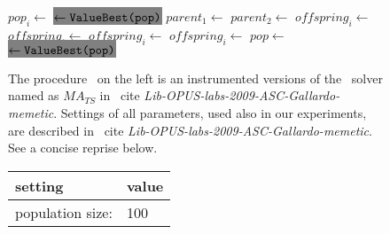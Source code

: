 
\begin{figure*}[t!]
\vspace*{-1ex}
\begin{minipage}[t]{0.49\linewidth}
\centering
\begin{algorithmic}[1]
 \label{alg_lssMAts_For1}
    \STATE $pop_i\gets$ 
    \STATE {}
\ENDFOR \label{alg_lssMAts_For2}
\STATE \colorbox{Gray}{ $\gets \texttt{{ValueBest}(pop)}$}
         \label{alg_lssMAts_Rec1}
            \STATE $parent_1 \gets $
            \STATE $parent_2 \gets $
            \STATE $\mathit{offspring_i}\gets$
        \ELSE
            \STATE $\mathit{offspring}_i \gets $
        \ENDIF \label{alg_lssMAts_Rec2}
         \label{alg_lssMAts_Mut1}
            \STATE $\mathit{offspring}_i \gets $
        \ENDIF \label{alg_lssMAts_Mut2}
        \STATE $\mathit{offspring}_i \gets$
        \STATE {}
    \ENDFOR
    \STATE $pop \gets$ \label{alg_lssMAts_Sel}
    \STATE \colorbox{Gray}{ $\gets \texttt{{ValueBest}(pop)}$}
\ENDWHILE
\ENDPROCEDURE 
\end{algorithmic}
\label{fg-lssMAts-lssRRts-a}
\end{minipage}
\begin{minipage}[t]{0.49\linewidth}
{\small	
The procedure \lssMAts\ on the left is an instrumented versions of the 
\labs\ solver named as $MA_{TS}$
in~ cite {\em Lib-OPUS-labs-2009-ASC-Gallardo-memetic}.
Settings of all parameters,
used also in our experiments, are described
in~ cite {\em Lib-OPUS-labs-2009-ASC-Gallardo-memetic}.
See a concise reprise below.
\par\vspace*{2ex}
\begin{tabular}{l l}
 {\bf setting} & {\bf value} \\
 \hline
 population size: & 100 \\

\end{tabular}}
\end{minipage}
\end{figure*}
